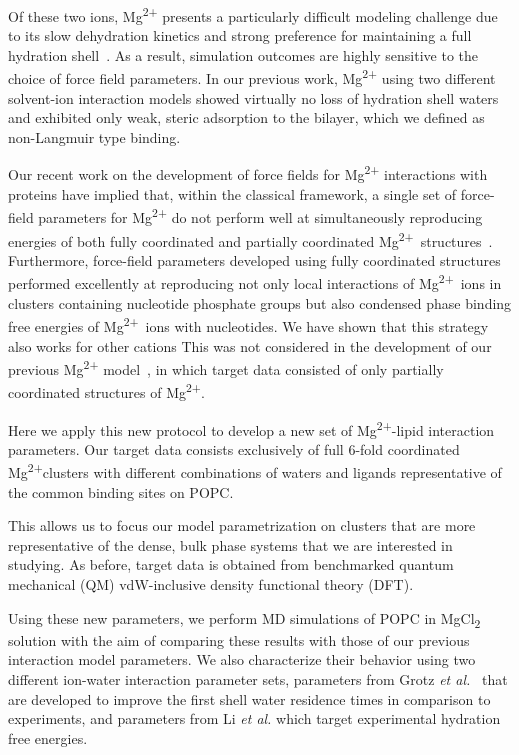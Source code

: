 \documentclass[12pt,openany,final]{book}
\newcommand{\etal}{\textit{et al.}}
\newcommand{\mg}{Mg\textsuperscript{2+}}
\newcommand{\mgcl}{MgCl\textsubscript{2}}
\begin{document}
Of these two ions, \mg{} presents a particularly difficult modeling challenge due to its slow dehydration kinetics and
strong preference for maintaining a full hydration shell~\cite{grotz:2021:optimized}. As a result,
simulation outcomes are highly sensitive to the
choice of force field parameters. %
In our previous work, \mg{} using two different solvent-ion interaction models
showed virtually no loss of hydration shell waters and exhibited only weak, steric
adsorption to the bilayer, which we defined as non-Langmuir type binding.

{\color{red} Our recent work on the development of force fields for \mg{} interactions with proteins
have implied that, within the classical framework, a single set of force-field parameters for \mg{} do not perform well at simultaneously reproducing
energies of both fully coordinated
and partially coordinated \mg~structures~\cite{julian:2023:mg}. Furthermore, force-field parameters developed using fully coordinated structures performed excellently at reproducing not only local interactions of \mg~ions in clusters containing nucleotide phosphate groups but also condensed phase binding free energies of \mg~ions with nucleotides\cite{julian:2023:mg}. We have shown that this strategy also works for other cations \cite{JACS2025}
This was not considered in the development of our previous \mg{} model~\cite{saunders:2024}, in which target data consisted of only partially coordinated structures of \mg.

Here we apply this new protocol to develop a new set of \mg{}-lipid
interaction parameters. Our target data consists exclusively of full 6-fold coordinated \mg clusters with
different combinations of waters and ligands representative of the common binding sites on POPC.}
This allows us to focus our model parametrization on clusters that are more representative of the dense, bulk phase systems
that we are interested in studying. As before, target data is obtained from benchmarked quantum mechanical (QM) vdW-inclusive density functional theory (DFT).

Using these new parameters, we perform MD simulations of POPC in \mgcl{} solution with the aim of comparing these results
with those of our previous interaction model parameters. We also characterize their behavior using two different
ion-water interaction parameter sets, parameters from Grotz \etal~\cite{grotz:2021:optimized,micro} that are developed to
improve the first shell water residence times in comparison to experiments, and parameters from Li
\etal{}\cite{merzhfe} which target experimental hydration free energies.
\end{document}
